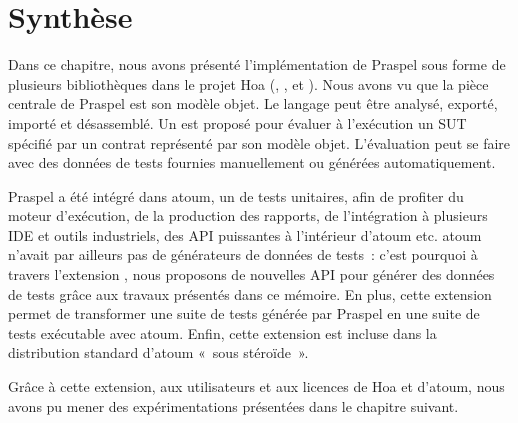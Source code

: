 \section{Synthèse}
\label{section:tools:summary}

Dans ce chapitre, nous avons présenté l'implémentation de Praspel sous forme de
plusieurs bibliothèques dans le projet Hoa (,
,  et
). Nous avons vu que la pièce centrale de Praspel est
son modèle objet. Le langage peut être analysé, exporté, importé et désassemblé.
Un  est proposé pour évaluer à l'exécution
un SUT spécifié par un contrat représenté par son modèle objet. L'évaluation
peut se faire avec des données de tests fournies manuellement ou générées
automatiquement.

Praspel a été intégré dans atoum, un  de tests unitaires,
afin de profiter du moteur d'exécution, de la production des rapports, de
l'intégration à plusieurs IDE et outils industriels, des API puissantes à
l'intérieur d'atoum etc. atoum n'avait par ailleurs pas de générateurs de
données de tests~: c'est pourquoi à travers l'extension
, nous proposons de nouvelles API pour
générer des données de tests grâce aux travaux présentés dans ce mémoire. En
plus, cette extension permet de transformer une suite de tests générée par
Praspel en une suite de tests exécutable avec atoum. Enfin, cette extension est
incluse dans la distribution standard d'atoum «~sous stéroïde~».

Grâce à cette extension, aux utilisateurs et aux licences
 de Hoa et d'atoum, nous avons pu mener des
expérimentations présentées dans le chapitre suivant.
